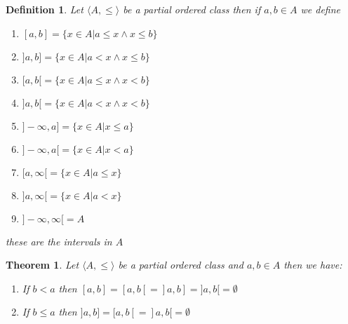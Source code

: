 \documentclass{book}
\newtheorem{definition}{Definition}
{\theorembodyfont{\rmfamily}\newtheorem{example}{Example}}
\newtheorem{theorem}{Theorem}
\begin{document}
\begin{definition}
  \label{interval interval}Let $\langle A, \leqslant \rangle$ be a partial
  ordered class then if $a, b \in A$ we define
  \begin{enumerate}
    \item $[a, b] = \{ x \in A|a \leqslant x \wedge x \leqslant b \}$
    
    \item $] a, b] = \{ x \in A|a < x \wedge x \leqslant b \}$
    
    \item $[a, b [= \{ x \in A|a \leqslant x \wedge x < b \}$
    
    \item $] a, b [= \{ x \in A|a < x \wedge x < b \}$
    
    \item $] - \infty, a] = \{ x \in A|x \leqslant a \}$
    
    \item $] - \infty, a [= \{ x \in A|x < a \}$
    
    \item $[a, \infty [= \{ x \in A|a \leqslant x \}$
    
    \item $] a, \infty [= \{ x \in A|a < x \}$
    
    \item $] - \infty, \infty [= A$
  \end{enumerate}
  these are the intervals in $A$
\end{definition}

\begin{theorem}
  \label{interval condition to be empty}Let $\langle A, \leqslant \rangle$ be
  a partial ordered class and $a, b \in A$ then we have:
  \begin{enumerate}
    \item If $b < a$ then $[a, b] = [a, b [=] a, b] =] a, b [= \emptyset$
    
    \item If $b \leqslant a$ then $] a, b] = [a, b [=] a, b [= \emptyset$
  \end{enumerate}
\end{theorem}
\end{document}
